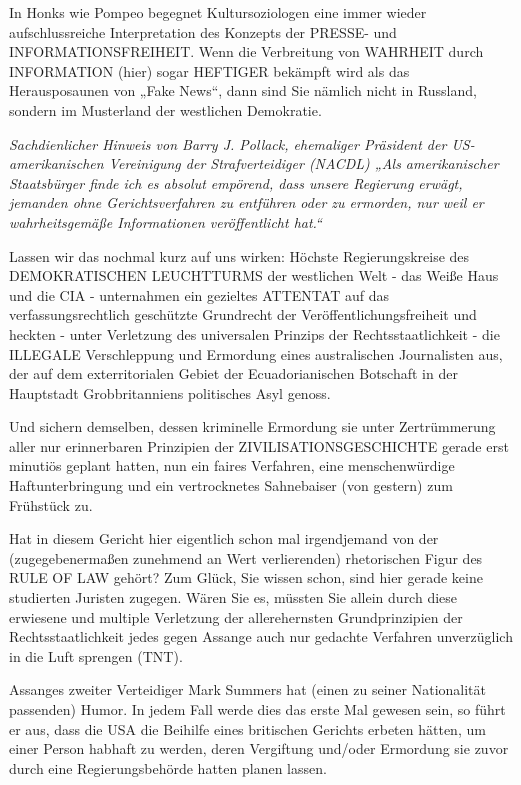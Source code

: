 \begin{multicols}{2}
In Honks wie Pompeo begegnet Kultursoziologen eine
immer wieder aufschlussreiche Interpretation des Konzepts der PRESSE- und INFORMATIONSFREIHEIT.
Wenn die Verbreitung von WAHRHEIT durch INFORMATION (hier) sogar HEFTIGER bekämpft wird als das
Herausposaunen von „Fake News“, dann sind Sie nämlich nicht in Russland, sondern im Musterland der westlichen Demokratie.

\textit{Sachdienlicher Hinweis von Barry J. Pollack, ehemaliger
Präsident der US-amerikanischen Vereinigung der Strafverteidiger (NACDL)
„Als amerikanischer Staatsbürger finde ich es absolut empörend, dass unsere Regierung erwägt, jemanden ohne
Gerichtsverfahren zu entführen oder zu ermorden, nur
weil er wahrheitsgemäße Informationen veröffentlicht hat.“}

Lassen wir das nochmal kurz auf uns wirken: Höchste
Regierungskreise des DEMOKRATISCHEN LEUCHTTURMS der westlichen Welt - das Weiße Haus und die
CIA - unternahmen ein gezieltes ATTENTAT auf das
verfassungsrechtlich geschützte Grundrecht der Veröffentlichungsfreiheit und heckten - unter Verletzung
des universalen Prinzips der Rechtsstaatlichkeit - die
ILLEGALE Verschleppung und Ermordung eines australischen Journalisten aus, der auf dem exterritorialen Gebiet der Ecuadorianischen Botschaft in der Hauptstadt
Grobbritanniens politisches Asyl genoss.

Und sichern demselben, dessen kriminelle Ermordung
sie unter Zertrümmerung aller nur erinnerbaren Prinzipien der ZIVILISATIONSGESCHICHTE gerade erst
minutiös geplant hatten, nun ein faires Verfahren, eine
menschenwürdige Haftunterbringung und ein vertrocknetes Sahnebaiser (von gestern) zum Frühstück zu.

Hat in diesem Gericht hier eigentlich schon mal irgendjemand von der (zugegebenermaßen zunehmend an
Wert verlierenden) rhetorischen Figur des RULE OF LAW
gehört? Zum Glück, Sie wissen schon, sind hier gerade
keine studierten Juristen zugegen. Wären Sie es, müssten
Sie allein durch diese erwiesene und multiple Verletzung
der allerehernsten Grundprinzipien der Rechtsstaatlichkeit jedes gegen Assange auch nur gedachte Verfahren
unverzüglich in die Luft sprengen (TNT).

Assanges zweiter Verteidiger Mark Summers hat (einen
zu seiner Nationalität passenden) Humor. In jedem Fall
werde dies das erste Mal gewesen sein, so führt er aus,
dass die USA die Beihilfe eines britischen Gerichts erbeten hätten, um einer Person habhaft zu werden, deren
Vergiftung und/oder Ermordung sie zuvor durch eine
Regierungsbehörde hatten planen lassen.



\end{multicols}
